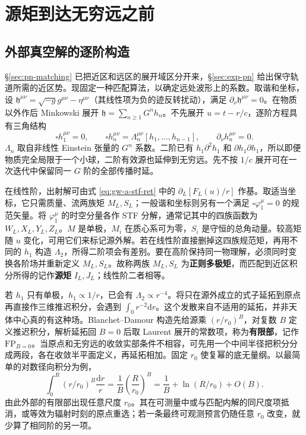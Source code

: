 \section{源矩到达无穷远之前}\label{sec:gw-a-pn}

\subsection{外部真空解的逐阶构造}

\S\ref{sec:pn-matching} 已把近区和远区的展开域区分开来，\S\ref{sec:exp-pn} 给出保守轨道所需的近区势。现固定一种匹配算法，以确定远处波形上的系数。取谐和坐标，设 $\mathfrak h^{\mu\nu}=\sqrt{-g}g^{\mu\nu}-\eta^{\mu\nu}$（其线性项为负的迹反转扰动），满足 $\partial_\nu\mathfrak h^{\mu\nu}=0$。在物质以外作后 Minkowski 展开 $\mathfrak h=\sum_{n\ge1}G^n h_n$。不先展开 $u=t-r/c$，逐阶方程具有三角结构
\[
 \square h_1^{\mu\nu}=0,\qquad
 \square h_n^{\mu\nu}=\Lambda_n^{\mu\nu}[h_1,\ldots,h_{n-1}],\qquad
 \partial_\nu h_n^{\mu\nu}=0 .
\]
$\Lambda_n$ 取自非线性 Einstein 张量的 $G^n$ 系数。二阶已有 $h_1\partial^2h_1$ 和 $\partial h_1\partial h_1$，所以即便物质完全局限于一个小球，二阶有效源也延伸到无穷远。先不按 $1/c$ 展开可在一次迭代中保留同一 $G$ 阶的全部传播时延。

在线性阶，出射解可由式 \eqref{eq:gw-a-stf-ret} 中的 $\partial_L[F_L(u)/r]$ 作基。取适当坐标，它只需质量、流两族矩 $M_L,S_L$；一般谐和坐标则另有一个满足 $\square\varphi_1^\mu=0$ 的规范矢量。将 $\varphi_1^\mu$ 的时空分量各作 STF 分解，通常记其中的四族函数为 $W_L,X_L,Y_L,Z_L$。$M$ 是单极，$M_i$ 在质心系可为零，$S_i$ 是守恒的总角动量。较高矩随 $u$ 变化，可用它们来标记源外解。若在线性阶直接删掉这四族规范矩，再用不同的 $h_1$ 构造 $\Lambda_2$，所得二阶项会有差别。要在高阶保持同一物理解，必须同时变换各阶场并重新定义 $M_L,S_L$。故称两族 $M_L,S_L$ 为\textbf{正则多极矩}，而匹配到近区积分所得的记作\textbf{源矩} $I_L,J_L$；线性阶二者相等。

若 $h_1$ 只有单极，$h_1\propto1/r$，已会有 $\Lambda_2\propto r^{-4}$。将只在源外成立的式子延拓到原点再直接作三维推迟积分，会遇到 $\int_0 r^{-2}\mathrm dr$。这个发散来自不适用的延拓，并非天体中心真的有这种场。Blanchet--Damour 构造先给源乘 $(r/r_0)^B$，对复数 $B$ 定义推迟积分，解析延拓回 $B=0$ 后取 Laurent 展开的常数项，称为\textbf{有限部}，记作 $\mathrm{FP}_{B=0}$。当原点和无穷远的收敛实部条件不相容，可先用一个中间半径把积分分成两段，各在收敛半平面定义，再延拓相加。固定 $r_0$ 使复幂的底无量纲。以最简单的对数径向积分为例，
\[
 \int_0^R(r/r_0)^B\frac{\mathrm dr}{r}
       =\frac{1}{B}\left(\frac{R}{r_0}\right)^B
       =\frac1B+\ln(R/r_0)+O(B).
\]
由此外部的有限部出现任意尺度 $r_0$。其在可测量中或与匹配内解的同尺度项抵消，或等效为辐射时刻的原点重选；若一条最终可观测预言仍随任意 $r_0$ 改变，就少算了相同阶的另一项。

